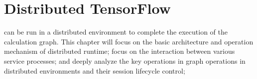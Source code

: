 \begin{savequote}[45mm]
\end{savequote}


\chapter{Distributed TensorFlow}
\label{ch:distributed}
\begin{content}
\tf{} can be run in a distributed environment to complete the execution of the calculation graph. This chapter will focus on the basic architecture and operation mechanism of distributed runtime; focus on the interaction between various service processes; and deeply analyze the key operations in graph operations in distributed environments and their session lifecycle control;
\end{content}


